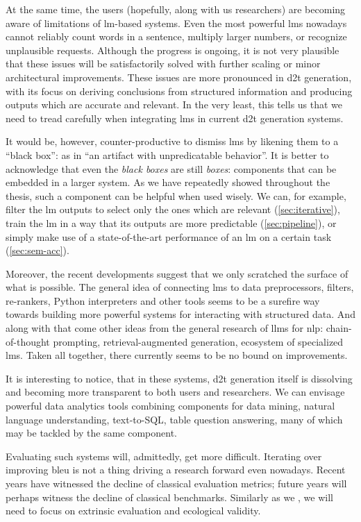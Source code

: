 At the same time, the users (hopefully, along with us researchers) are becoming aware of limitations of \ac{lm}-based systems. Even the most powerful \acp{lm} nowadays cannot reliably count words in a sentence, multiply larger numbers, or recognize unplausible requests. Although the progress is ongoing, it is not very plausible that these issues will be satisfactorily solved with further scaling or minor architectural improvements. These issues are more pronounced in \ac{d2t} generation, with its focus on deriving conclusions from structured information and producing outputs which are accurate and relevant. In the very least, this tells us that we need to tread carefully when integrating \acp{lm} in current \ac{d2t} generation systems.

It would be, however, counter-productive to dismiss \acp{lm} by likening them to a ``black box'': as in ``an artifact with unpredicatable behavior''. It is better to acknowledge that even the \emph{black boxes} are still \emph{boxes}: components that can be embedded in a larger system. As we have repeatedly showed throughout the thesis, such a component can be helpful when used wisely. We can, for example, filter the \ac{lm} outputs to select only the ones which are relevant (\autoref{sec:iterative}), train the \ac{lm} in a way that its outputs are more predictable (\autoref{sec:pipeline}), or simply make use of a state-of-the-art performance of an \ac{lm} on a certain task (\autoref{sec:sem-acc}).

Moreover, the recent developments suggest that we only scratched the surface of what is possible. The general idea of connecting \acp{lm} to data preprocessors, filters, re-rankers, Python interpreters and other tools seems to be a surefire way towards building more powerful systems for interacting with structured data. And along with that come other ideas from the general research of \acp{llm} for \ac{nlp}: chain-of-thought prompting, retrieval-augmented generation, ecosystem of specialized \acp{lm}. Taken all together, there currently seems to be no bound on improvements.

It is interesting to notice, that in these systems, \ac{d2t} generation itself is dissolving and becoming more transparent to both users and researchers. We can envisage powerful data analytics tools combining components for data mining, natural language understanding, text-to-SQL, table question answering, many of which may be tackled by the same component.

Evaluating such systems will, admittedly, get more difficult. Iterating over improving \acs{bleu} is not a thing driving a research forward even nowadays. Recent years have witnessed the decline of classical evaluation metrics; future years will perhaps witness the decline of classical benchmarks. Similarly as we , we will need to focus on extrinsic evaluation and ecological validity.
